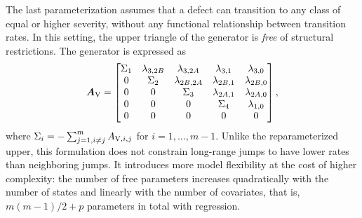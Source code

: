 The last parameterization assumes that a defect can transition to any class of equal or higher severity, without any functional relationship between transition rates. In this setting, the upper triangle of the generator is \textit{free} of structural restrictions. The generator is expressed as
\begin{align}
    \bm{A}_{\RN{5}} =
    \begin{bmatrix} 
    \Sigma_1 & \lambda_{3,2B} & \lambda_{3, 2A} & \lambda_{3, 1} & \lambda_{3, 0} \\
    0 & \Sigma_2 & \lambda_{2B, 2A} & \lambda_{2B, 1} & \lambda_{2B, 0} \\
    0 & 0 & \Sigma_3 & \lambda_{2A, 1} & \lambda_{2A, 0} \\
    0 & 0 & 0 & \Sigma_4 & \lambda_{1, 0} \\
    0 & 0 & 0 & 0 & 0 \\
    \end{bmatrix}, \label{eq:generator_free_upper}
\end{align}
where $\Sigma_i = -\sum_{j=1, i \neq j}^m A_{\RN{5},i,j}$ for $i = 1, \dots, m-1$.
Unlike the reparameterized upper, this formulation does not constrain long-range jumps to have lower rates than neighboring jumps. It introduces more model flexibility at the cost of higher complexity: the number of free parameters increases quadratically with the number of states and linearly with the number of covariates, that is, $m(m-1)/2+p$ parameters in total with regression.


\FloatBarrier




